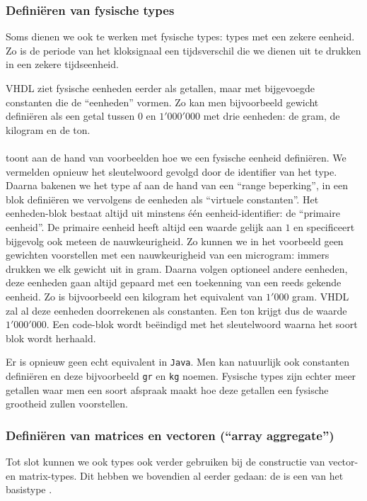 \subsubsection{Defini\"eren van fysische types}

Soms dienen we ook te werken met fysische types: types met een zekere eenheid. Zo is de periode van het kloksignaal een tijdsverschil die we dienen uit te drukken in een zekere tijdseenheid.

\parapgraph{}
VHDL ziet fysische eenheden eerder als getallen, maar met bijgevoegde constanten die de ``eenheden'' vormen. Zo kan men bijvoorbeeld gewicht defini\"eren als een getal tussen $0$ en $1'000'000$ met drie eenheden: de gram, de kilogram en de ton.

\paragraph{}
 toont aan de hand van voorbeelden hoe we een fysische eenheid defini\"eren. We vermelden opnieuw het sleutelwoord  gevolgd door de identifier van het type. Daarna bakenen we het type af aan de hand van een ``range beperking'', in een  blok defini\"eren we vervolgens de eenheden als ``virtuele constanten''. Het eenheden-blok bestaat altijd uit minstens \'e\'en eenheid-identifier: de ``primaire eenheid''. De primaire eenheid heeft altijd een waarde gelijk aan $1$ en specificeert bijgevolg ook meteen de nauwkeurigheid. Zo kunnen we in het voorbeeld geen gewichten voorstellen met een nauwkeurigheid van een microgram: immers drukken we elk gewicht uit in gram. Daarna volgen optioneel andere eenheden, deze eenheden gaan altijd gepaard met een toekenning van een reeds gekende eenheid. Zo is bijvoorbeeld een kilogram het equivalent van $1'000$ gram. VHDL zal al deze eenheden doorrekenen als constanten. Een ton krijgt dus de waarde $1'000'000$. Een code-blok wordt be\"eindigd met het  sleutelwoord waarna het soort blok wordt herhaald.


\parapgraph{}
Er is opnieuw geen echt equivalent in \texttt{Java}. Men kan natuurlijk ook constanten defini\"eren en deze bijvoorbeeld \texttt{gr} en \texttt{kg} noemen. Fysische types zijn echter meer getallen waar men een soort afspraak maakt hoe deze getallen een fysische grootheid zullen voorstellen.


\subsubsection{Defini\"eren van matrices en vectoren (``array aggregate'')}
Tot slot kunnen we ook types ook verder gebruiken bij de constructie van vector- en matrix-types. Dit hebben we bovendien al eerder gedaan: de  is een  van het basistype .

